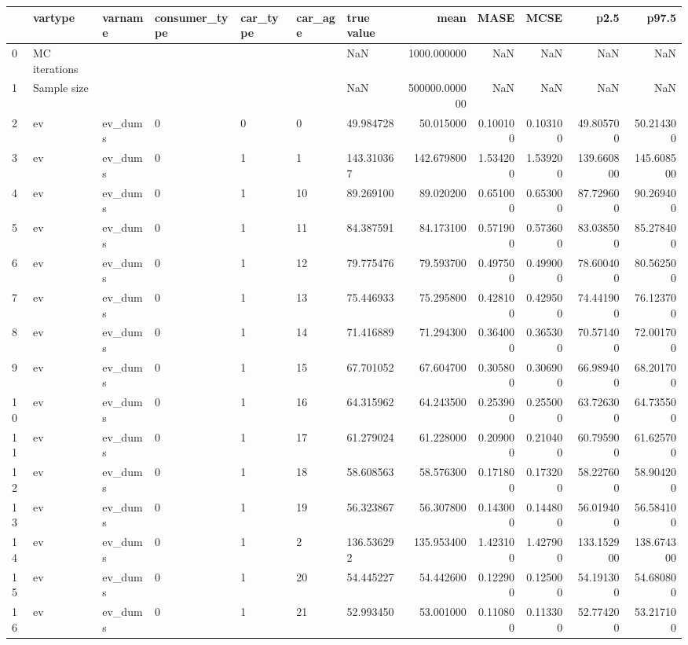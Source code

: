 \begin{tabular}{lllllllrrrrr}
\toprule
 & vartype & varname & consumer_type & car_type & car_age & true value & mean & MASE & MCSE & p2.5 & p97.5 \\
\midrule
0 & MC iterations &  &  &  &  & NaN & 1000.000000 & NaN & NaN & NaN & NaN \\
1 & Sample size &  &  &  &  & NaN & 500000.000000 & NaN & NaN & NaN & NaN \\
2 & ev & ev_dums & 0 & 0 & 0 & 49.984728 & 50.015000 & 0.100100 & 0.103100 & 49.805700 & 50.214300 \\
3 & ev & ev_dums & 0 & 1 & 1 & 143.310367 & 142.679800 & 1.534200 & 1.539200 & 139.660800 & 145.608500 \\
4 & ev & ev_dums & 0 & 1 & 10 & 89.269100 & 89.020200 & 0.651000 & 0.653000 & 87.729600 & 90.269400 \\
5 & ev & ev_dums & 0 & 1 & 11 & 84.387591 & 84.173100 & 0.571900 & 0.573600 & 83.038500 & 85.278400 \\
6 & ev & ev_dums & 0 & 1 & 12 & 79.775476 & 79.593700 & 0.497500 & 0.499000 & 78.600400 & 80.562500 \\
7 & ev & ev_dums & 0 & 1 & 13 & 75.446933 & 75.295800 & 0.428100 & 0.429500 & 74.441900 & 76.123700 \\
8 & ev & ev_dums & 0 & 1 & 14 & 71.416889 & 71.294300 & 0.364000 & 0.365300 & 70.571400 & 72.001700 \\
9 & ev & ev_dums & 0 & 1 & 15 & 67.701052 & 67.604700 & 0.305800 & 0.306900 & 66.989400 & 68.201700 \\
10 & ev & ev_dums & 0 & 1 & 16 & 64.315962 & 64.243500 & 0.253900 & 0.255000 & 63.726300 & 64.735500 \\
11 & ev & ev_dums & 0 & 1 & 17 & 61.279024 & 61.228000 & 0.209000 & 0.210400 & 60.795900 & 61.625700 \\
12 & ev & ev_dums & 0 & 1 & 18 & 58.608563 & 58.576300 & 0.171800 & 0.173200 & 58.227600 & 58.904200 \\
13 & ev & ev_dums & 0 & 1 & 19 & 56.323867 & 56.307800 & 0.143000 & 0.144800 & 56.019400 & 56.584100 \\
14 & ev & ev_dums & 0 & 1 & 2 & 136.536292 & 135.953400 & 1.423100 & 1.427900 & 133.152900 & 138.674300 \\
15 & ev & ev_dums & 0 & 1 & 20 & 54.445227 & 54.442600 & 0.122900 & 0.125000 & 54.191300 & 54.680800 \\
16 & ev & ev_dums & 0 & 1 & 21 & 52.993450 & 53.001000 & 0.110800 & 0.113300 & 52.774200 & 53.217100 \\

\end{tabular}
